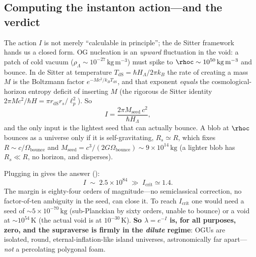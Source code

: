 \subsection{Computing the instanton action---and the verdict}
\label{sec:instanton}

The action $I$ is not merely ``calculable in principle''; the de Sitter framework
hands us a closed form. OG nucleation is an \emph{upward} fluctuation in the void: a
patch of cold vacuum ($\rho_\Lambda\sim10^{-27}\,\mathrm{kg\,m^{-3}}$) must spike to
$\rhoc\sim10^{50}\,\mathrm{kg\,m^{-3}}$ and bounce. In de Sitter at temperature
$T_{\mathrm{dS}}=\hbar H_\Lambda/2\pi k_B$ the rate of creating a mass $M$ is the
Boltzmann factor $e^{-Mc^2/k_BT_{\mathrm{dS}}}$, and that exponent \emph{equals} the
cosmological-horizon entropy deficit of inserting $M$ (the rigorous de Sitter
identity $2\pi Mc^2/\hbar H = \pi r_{\mathrm{dS}} r_s/\ell_p^2$). So
\begin{equation}
  I = \frac{2\pi M_{\mathrm{seed}}\,c^2}{\hbar H_\Lambda},
  \label{eq:instanton}
\end{equation}
and the only input is the lightest seed that can actually bounce. A blob at $\rhoc$
bounces as a universe only if it is self-gravitating, $R_s\simeq R$, which fixes
$R\sim c/\Omega_{\mathrm{bounce}}$ and
$M_{\mathrm{seed}}=c^3/(2G\Omega_{\mathrm{bounce}})\sim9\times10^{14}\,\mathrm{kg}$
(a lighter blob has $R_s\ll R$, no horizon, and disperses).

Plugging in gives the answer ():
\begin{equation}
  I \;\sim\; 2.5\times10^{84} \;\gg\; I_{\mathrm{crit}}\simeq1.4 .
\end{equation}
The margin is eighty-four orders of magnitude---no semiclassical correction, no
factor-of-ten ambiguity in the seed, can close it. To reach $I_{\mathrm{crit}}$ one
would need a seed of $\sim5\times10^{-70}\,\mathrm{kg}$ (sub-Planckian by sixty
orders, unable to bounce) or a void at $\sim10^{54}\,\mathrm{K}$ (the actual void is
at $10^{-30}\,\mathrm{K}$). \textbf{So $\lambda=e^{-I}$ is, for all purposes, zero,
and the supraverse is firmly in the \emph{dilute} regime}: OGUs are isolated, round,
eternal-inflation-like island universes, astronomically far apart---\emph{not} a
percolating polygonal foam.

